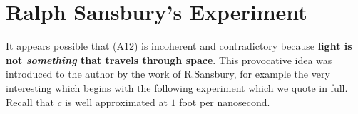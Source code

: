 \documentclass[12pt]{amsart}
\theoremstyle{definition}
\theoremstyle{remark}
\begin{document}









\section{Ralph Sansbury's Experiment}
It appears possible that (A12) is incoherent and contradictory because \textbf{light is not \emph{something} that travels through space}. This provocative idea was introduced to the author by the work of R.Sansbury, for example the very interesting \cite{sansburyspeed} which begins with the following experiment which we quote in full. Recall that $c$ is well approximated at $1$ foot per nanosecond.
\end{document}
